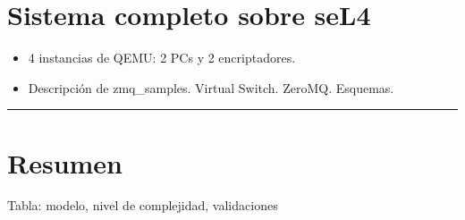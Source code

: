 


\section{Sistema completo sobre seL4}
\begin{itemize}
    \item 4 instancias de QEMU: 2 PCs y 2 encriptadores.
    \item Descripción de zmq\_samples. Virtual Switch. ZeroMQ. Esquemas. 
\end{itemize}

\noindent\rule{\textwidth}{0.4pt}





\section{Resumen}
Tabla: modelo, nivel de complejidad, validaciones
